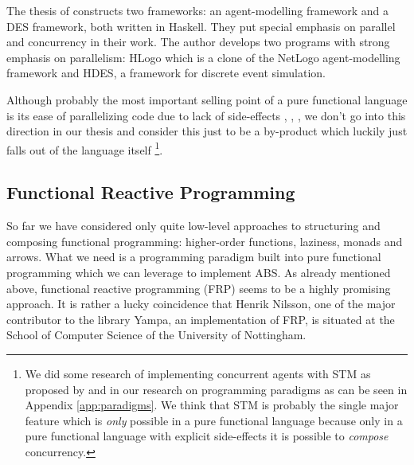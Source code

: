 The thesis of \cite{bezirgiannis_improving_2013} constructs two frameworks: an agent-modelling framework and a DES framework, both written in Haskell. They put special emphasis on parallel and concurrency in their work. The author develops two programs with strong emphasis on parallelism: HLogo which is a clone of the NetLogo agent-modelling framework and HDES, a framework for discrete event simulation.

Although probably the most important selling point of a pure functional language is its ease of parallelizing code due to lack of side-effects \cite{peyton_jones_concurrent_1996}, \cite{osullivan_real_2008}, \cite{jones_tutorial_2009}, \cite{marlow_parallel_2013} we don't go into this direction in our thesis and consider this just to be a by-product which luckily just falls out of the language itself \footnote{We did some research of implementing concurrent agents with STM as proposed by \cite{sweeney_next_2006} and \cite{bezirgiannis_improving_2013} in our research on programming paradigms as can be seen in Appendix \ref{app:paradigms}. We think that STM is probably the single major feature which is \textit{only} possible in a pure functional language because only in a pure functional language with explicit side-effects it is possible to \textit{compose} concurrency.}.


\subsection{Functional Reactive Programming}
So far we have considered only quite low-level approaches to structuring and composing functional programming: higher-order functions, laziness, monads and arrows. What we need is a programming paradigm built into pure functional programming which we can leverage to implement ABS. As already mentioned above, functional reactive programming (FRP) seems to be a highly promising approach. It is rather a lucky coincidence that Henrik Nilsson, one of the major contributor to the library Yampa, an implementation of FRP, is situated at the School of Computer Science of the University of Nottingham.

